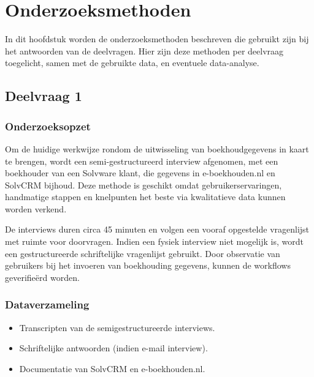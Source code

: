 \chapter{Onderzoeksmethoden}

In dit hoofdstuk worden de onderzoeksmethoden beschreven die gebruikt zijn bij het antwoorden van de deelvragen.
Hier zijn deze methoden per deelvraag toegelicht, samen met de gebruikte data, en eventuele data-analyse.


\section{Deelvraag 1}

\subsection{Onderzoeksopzet}

Om de huidige werkwijze rondom de uitwisseling van boekhoudgegevens in kaart te brengen,
wordt een semi-gestructureerd interview afgenomen, met een boekhouder van een Solvware klant, die gegevens in e-boekhouden.nl en SolvCRM bijhoud.
Deze methode is geschikt omdat gebruikerservaringen, handmatige stappen en knelpunten het beste via kwalitatieve data kunnen worden verkend.

De interviews duren circa 45 minuten en volgen een vooraf opgestelde vragenlijst met ruimte
voor doorvragen.
Indien een fysiek interview niet mogelijk is, wordt een gestructureerde
schriftelijke vragenlijst gebruikt.
Door observatie van gebruikers bij het invoeren van boekhouding gegevens, kunnen de workflows geverifieërd worden.

\subsection{Dataverzameling}
\begin{itemize}
    \item Transcripten van de semigestructureerde interviews.
    \item Schriftelijke antwoorden (indien e-mail interview).
    \item Documentatie van SolvCRM en e-boekhouden.nl.
\end{itemize}


